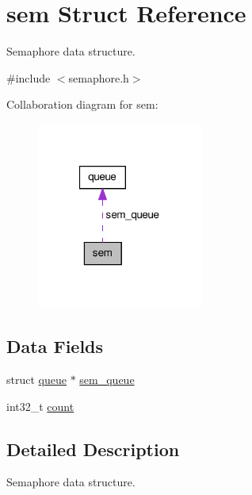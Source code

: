 \hypertarget{structsem}{\section{sem Struct Reference}
\label{structsem}
}


Semaphore data structure.  




{\ttfamily \#include $<$semaphore.\-h$>$}



Collaboration diagram for sem\-:\nopagebreak
\begin{figure}[H]
\begin{center}
\leavevmode
\includegraphics[width=155pt]{structsem__coll__graph}
\end{center}
\end{figure}
\subsection*{Data Fields}
\begin{DoxyCompactItemize}
\item 
struct \hyperlink{structqueue}{queue} $\ast$ \hyperlink{structsem_a723ac960b2566b855b905fa4aa324f9b}{sem\-\_\-queue}
\item 
int32\-\_\-t \hyperlink{structsem_a798dc7e825b1e632b2db49b473b17636}{count}
\end{DoxyCompactItemize}


\subsection{Detailed Description}
Semaphore data structure. 

